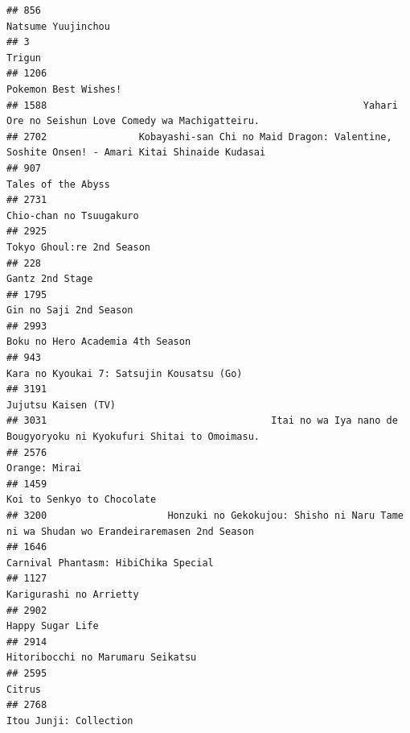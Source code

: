 \documentclass[
]{article}
\begin{document}
\begin{verbatim}
## 856                                                                                         Natsume Yuujinchou
## 3                                                                                                       Trigun
## 1206                                                                                      Pokemon Best Wishes!
## 1588                                                       Yahari Ore no Seishun Love Comedy wa Machigatteiru.
## 2702                Kobayashi-san Chi no Maid Dragon: Valentine, Soshite Onsen! - Amari Kitai Shinaide Kudasai
## 907                                                                                         Tales of the Abyss
## 2731                                                                                   Chio-chan no Tsuugakuro
## 2925                                                                                 Tokyo Ghoul:re 2nd Season
## 228                                                                                            Gantz 2nd Stage
## 1795                                                                                    Gin no Saji 2nd Season
## 2993                                                                          Boku no Hero Academia 4th Season
## 943                                                                  Kara no Kyoukai 7: Satsujin Kousatsu (Go)
## 3191                                                                                       Jujutsu Kaisen (TV)
## 3031                                       Itai no wa Iya nano de Bougyoryoku ni Kyokufuri Shitai to Omoimasu.
## 2576                                                                                             Orange: Mirai
## 1459                                                                                Koi to Senkyo to Chocolate
## 3200                     Honzuki no Gekokujou: Shisho ni Naru Tame ni wa Shudan wo Erandeiraremasen 2nd Season
## 1646                                                                      Carnival Phantasm: HibiChika Special
## 1127                                                                                   Karigurashi no Arrietty
## 2902                                                                                          Happy Sugar Life
## 2914                                                                         Hitoribocchi no Marumaru Seikatsu
## 2595                                                                                                    Citrus
## 2768                                                                                    Itou Junji: Collection

\end{verbatim}
\end{document}
